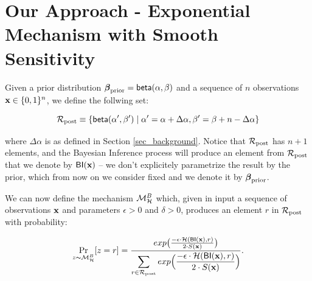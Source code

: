 \documentclass[sigconf]{acmart}
\begin{document}

\section{Our Approach - Exponential Mechanism with Smooth Sensitivity}
\label{sec_smoo}
Given a prior distribution $\boldsymbol{\beta}_{\textup{prior}}=\mathsf{beta}(\alpha, \beta)$ and a sequence of $n$ observations $\textbf{x}\in\{0,1\}^n$, we define the follwing set:

\[
  \mathcal{R}_{\textup{post}}\equiv\{\mathsf{beta}(\alpha',\beta')\mid \alpha'=\alpha+\Delta\alpha, \beta'=\beta+n-\Delta\alpha\}
\]

where $\Delta\alpha$ is as defined in Section
\ref{sec_background}. Notice that $\mathcal{R}_{\textup{post}}$ has $n + 1$ elements, and
the Bayesian Inference process will produce an element from $\mathcal{R}_{\textup{post}}$
that we denote by $\mathsf{BI}(\textbf{x})$ -- we don't explicitely
parametrize the result by the prior, which from now on we consider
fixed and we denote it by $\boldsymbol{\beta}_{\textup{prior}}$.


We can now define the mechanism $\mathcal{M}^{B}_{\mathcal{H}}$ which, given in input a
sequence of observations $\textbf{x}$ and parameters $\epsilon>0$ and
$\delta>0$, produces an element $r$ in $\mathcal{R}_{\textup{post}}$ with probability:

\begin{equation*}
\underset{z \thicksim \mathcal{M}^{B}_{\mathcal{H}}}{\Pr}[z=r] = \frac {exp\big(\frac{-\epsilon\cdot\mathcal{H}(\mathsf{BI}(\textbf{x}),r)}{2\cdot S(\textbf{x})}\big)}
{\displaystyle\sum_{r\in\mathcal{R}_{\textup{post}}} exp\Big(\frac{-\epsilon\cdot\mathcal{H}(\mathsf{BI}(\textbf{x}),r)}{2\cdot S(\textbf{x})}\Big)}.
\end{equation*}
\end{document}
